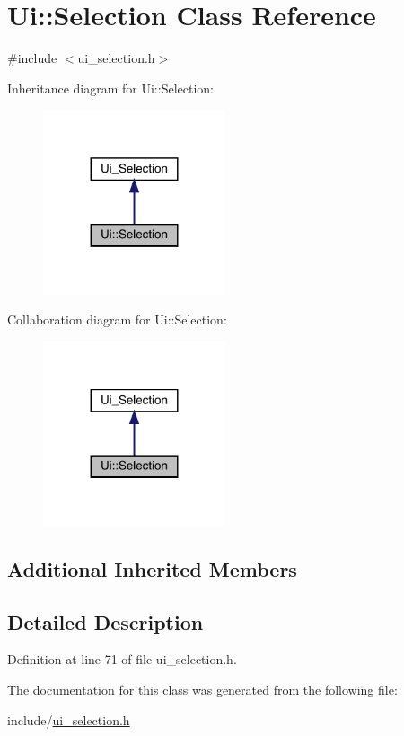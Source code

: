 \hypertarget{class_ui_1_1_selection}{}\section{Ui\+:\+:Selection Class Reference}
\label{class_ui_1_1_selection}


{\ttfamily \#include $<$ui\+\_\+selection.\+h$>$}



Inheritance diagram for Ui\+:\+:Selection\+:
\nopagebreak
\begin{figure}[H]
\begin{center}
\leavevmode
\includegraphics[width=152pt]{class_ui_1_1_selection__inherit__graph}
\end{center}
\end{figure}


Collaboration diagram for Ui\+:\+:Selection\+:
\nopagebreak
\begin{figure}[H]
\begin{center}
\leavevmode
\includegraphics[width=152pt]{class_ui_1_1_selection__coll__graph}
\end{center}
\end{figure}
\subsection*{Additional Inherited Members}


\subsection{Detailed Description}


Definition at line 71 of file ui\+\_\+selection.\+h.



The documentation for this class was generated from the following file\+:\begin{DoxyCompactItemize}
\item 
include/\mbox{\hyperlink{ui__selection_8h}{ui\+\_\+selection.\+h}}\end{DoxyCompactItemize}
